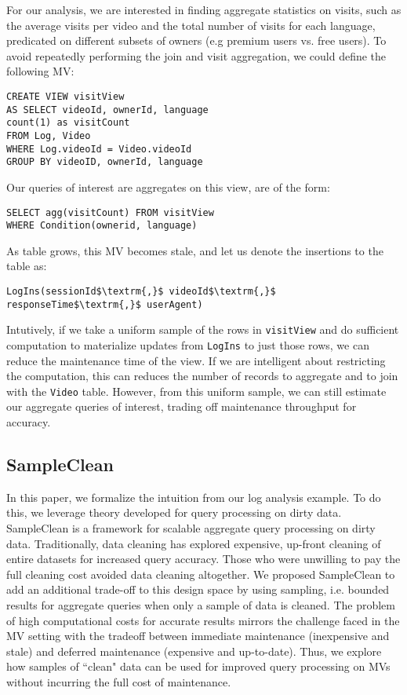 For our analysis, we are interested in finding aggregate statistics on visits, such as the average visits per video and the total number of visits for each language, predicated on different subsets of owners (e.g premium users vs. free users). 
To avoid repeatedly performing the join and visit aggregation, we could define the following MV:
\begin{lstlisting}[mathescape,basicstyle={\scriptsize}]
CREATE VIEW visitView
AS SELECT videoId, ownerId, language
count(1) as visitCount
FROM Log, Video
WHERE Log.videoId = Video.videoId
GROUP BY videoID, ownerId, language
\end{lstlisting}
Our queries of interest are aggregates on this view, are of the form:
\begin{lstlisting}[mathescape,basicstyle={\scriptsize}]
SELECT agg(visitCount) FROM visitView 
WHERE Condition(ownerid, language)
\end{lstlisting}

As  table grows, this MV becomes stale, and let us denote the insertions to the table as:
\begin{lstlisting}[mathescape,basicstyle={\scriptsize}]
LogIns(sessionId$\textrm{,}$ videoId$\textrm{,}$ responseTime$\textrm{,}$ userAgent)
\end{lstlisting}
Intutively, if we take a uniform sample of the rows in \texttt{visitView} and do sufficient computation to materialize updates from \texttt{LogIns} to just those rows, we can reduce the maintenance time of the view.
If we are intelligent about restricting the computation, this can reduces the number of  records to aggregate and to join with the \texttt{Video} table.
However, from this uniform sample, we can still estimate our aggregate queries of interest, trading off maintenance throughput for accuracy.

\subsection{SampleClean~\cite{wang1999sample}}
In this paper, we formalize the intuition from our log analysis example. 
To do this, we leverage theory developed for query processing on dirty data.
SampleClean is a framework for scalable aggregate query processing on dirty data.
Traditionally, data cleaning has explored expensive, up-front cleaning of entire datasets for increased query accuracy.
Those who were unwilling to pay the full cleaning cost avoided data cleaning altogether.
We proposed SampleClean to add an additional trade-off to this design space by using sampling, i.e. bounded results for aggregate queries when only a sample of data is cleaned.
The problem of high computational costs for accurate results mirrors the challenge faced in the MV setting with the tradeoff between immediate maintenance (inexpensive and stale) and deferred maintenance (expensive and up-to-date).
Thus, we explore how samples of ``clean" data can be used for improved query processing on MVs without incurring the full cost of maintenance.

